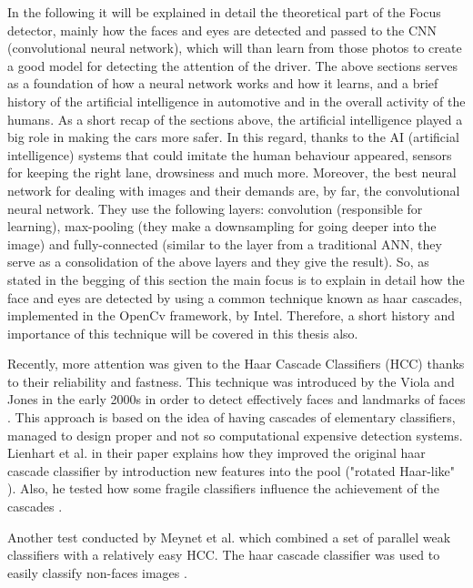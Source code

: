 In the following it will be explained in detail the theoretical part of the Focus detector, mainly how the faces and eyes are detected and passed to the CNN (convolutional neural network), which will than learn from those photos to create a good model for detecting the attention of the driver. The above sections serves as a foundation of how a neural network works and how it learns, and a brief history of the artificial intelligence in automotive and in the overall activity of the humans. As a short recap of the sections above, the artificial intelligence played a big role in making the cars more safer. In this regard, thanks to the AI (artificial intelligence) systems that could imitate the human behaviour appeared, sensors for keeping the right lane, drowsiness and much more. Moreover, the best neural network for dealing with images and their demands are, by far, the convolutional neural network. They use the following layers: convolution (responsible for learning), max-pooling (they make a downsampling for going deeper into the image) and fully-connected (similar to the layer from a traditional ANN, they serve as a consolidation of the above layers and they give the result). So, as stated in the begging of this section the main focus is to explain in detail how the face and eyes are detected by using a common technique known as haar cascades, implemented in the OpenCv framework, by Intel. Therefore, a short history and importance of this technique will be covered in this thesis also. \par

Recently, more attention was given to the Haar Cascade Classifiers (HCC) thanks to their reliability and fastness. This technique was introduced by the Viola and Jones in the early 2000s in order to detect effectively faces and landmarks of faces \cite{Viola}. This approach is based on the idea of having cascades of elementary classifiers, managed to design proper and not so computational expensive detection systems. Lienhart et al. \cite{Lienhart} in their paper explains how they improved the original haar cascade classifier by introduction new features into the pool ("rotated Haar-like" \cite{Viola}). Also, he tested how some fragile classifiers influence the achievement of the cascades \cite{Viola}. \par

Another test conducted by Meynet et al. \cite{Meynet} which combined a set of parallel weak classifiers with a relatively easy HCC. The haar cascade classifier was used to easily classify non-faces images \cite{Viola}. \par

